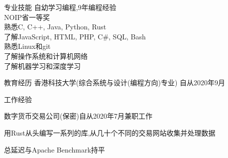 \documentclass[UTF8]{resume} %
\begin{document}
\begin{rSection}{专业技能}
    自幼学习编程,9年编程经验\\
    NOIP省一等奖\\
    熟悉C, C++, Java, Python, Rust\\
    了解JavaScript, HTML, PHP, C\#, SQL, Bash\\
    熟悉Linux和git\\
    了解操作系统和计算机网络\\
    了解机器学习和深度学习
\end{rSection}

\begin{rSection}{教育经历}
    香港科技大学(综合系统与设计(编程方向)专业) \hfill 自从2020年9月

\end{rSection}

\begin{rSection}{工作经验}
    \begin{rSubsection}{数字货币交易公司(保密)}{自从2020年7月}{兼职工作}{}
        \item 用Rust从头编写一系列的库,从几十个不同的交易网站收集并处理数据
        \item 总延迟与Apache Benchmark持平
    \end{rSubsection}
\end{rSection}
\end{document}
